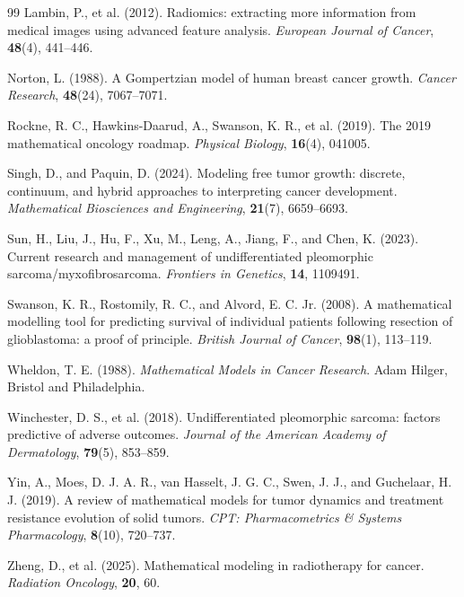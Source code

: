 \documentclass[11pt, reqno]{amsart}
\numberwithin{equation}{section}
\theoremstyle{definition}
\begin{document}
\begin{thebibliography}{99}
Lambin, P., et al. (2012).
Radiomics: extracting more information from medical images using advanced feature analysis.
\textit{European Journal of Cancer}, \textbf{48}(4), 441--446.

Norton, L. (1988).
A Gompertzian model of human breast cancer growth.
\textit{Cancer Research}, \textbf{48}(24), 7067--7071.

Rockne, R. C., Hawkins-Daarud, A., Swanson, K. R., et al. (2019).
The 2019 mathematical oncology roadmap.
\textit{Physical Biology}, \textbf{16}(4), 041005.

Singh, D., and Paquin, D. (2024).
Modeling free tumor growth: discrete, continuum, and hybrid approaches to interpreting cancer development.
\textit{Mathematical Biosciences and Engineering}, \textbf{21}(7), 6659--6693.

Sun, H., Liu, J., Hu, F., Xu, M., Leng, A., Jiang, F., and Chen, K. (2023).
Current research and management of undifferentiated pleomorphic sarcoma/myxofibrosarcoma.
\textit{Frontiers in Genetics}, \textbf{14}, 1109491.

Swanson, K. R., Rostomily, R. C., and Alvord, E. C. Jr. (2008).
A mathematical modelling tool for predicting survival of individual patients following resection of glioblastoma: a proof of principle.
\textit{British Journal of Cancer}, \textbf{98}(1), 113--119.

Wheldon, T. E. (1988).
\textit{Mathematical Models in Cancer Research}.
Adam Hilger, Bristol and Philadelphia.

Winchester, D. S., et al. (2018).
Undifferentiated pleomorphic sarcoma: factors predictive of adverse outcomes.
\textit{Journal of the American Academy of Dermatology}, \textbf{79}(5), 853--859.

Yin, A., Moes, D. J. A. R., van Hasselt, J. G. C., Swen, J. J., and Guchelaar, H. J. (2019).
A review of mathematical models for tumor dynamics and treatment resistance evolution of solid tumors.
\textit{CPT: Pharmacometrics \& Systems Pharmacology}, \textbf{8}(10), 720--737.

Zheng, D., et al. (2025).
Mathematical modeling in radiotherapy for cancer.
\textit{Radiation Oncology}, \textbf{20}, 60.

\end{thebibliography}
\end{document}
